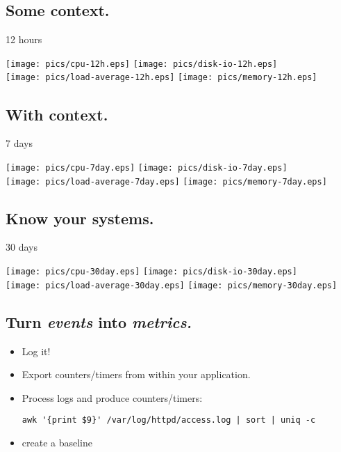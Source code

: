 \documentclass[xga]{xdvislides}
\begin{document}
\subsection{Some context.}
12 hours
\begin{center}
	\texttt{[image: pics/cpu-12h.eps]}
	\texttt{[image: pics/disk-io-12h.eps]} \\
	\texttt{[image: pics/load-average-12h.eps]}
	\texttt{[image: pics/memory-12h.eps]} \\
\end{center}

\subsection{With context.}
7 days
\begin{center}
	\texttt{[image: pics/cpu-7day.eps]}
	\texttt{[image: pics/disk-io-7day.eps]} \\
	\texttt{[image: pics/load-average-7day.eps]}
	\texttt{[image: pics/memory-7day.eps]} \\
\end{center}

\subsection{Know your systems.}
30 days
\begin{center}
	\texttt{[image: pics/cpu-30day.eps]}
	\texttt{[image: pics/disk-io-30day.eps]} \\
	\texttt{[image: pics/load-average-30day.eps]}
	\texttt{[image: pics/memory-30day.eps]} \\
\end{center}

\subsection{Turn {\em events} into {\em metrics.}}
\begin{itemize}
	\item Log it!
\end{itemize}

\addvspace{.5in}
\begin{itemize}
	\item Export counters/timers from within your application.
	\item Process logs and produce counters/timers:
\begin{verbatim}
awk '{print $9}' /var/log/httpd/access.log | sort | uniq -c
\end{verbatim}
	\item create a baseline
\end{itemize}
\end{document}
